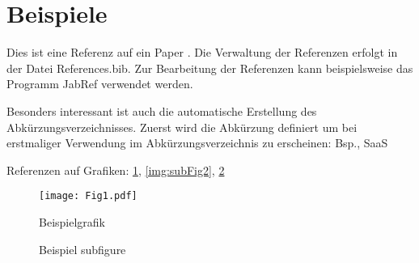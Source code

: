 \section{Beispiele}
Dies  ist eine Referenz auf ein Paper \cite{Kolter2009}. Die Verwaltung der Referenzen erfolgt in der Datei References.bib. Zur Bearbeitung der Referenzen kann beispielsweise das Programm JabRef verwendet werden.

Besonders interessant ist auch die automatische Erstellung des Abkürzungsverzeichnisses. Zuerst wird die Abkürzung definiert um bei erstmaliger Verwendung im Abkürzungsverzeichnis zu erscheinen: \ac{Bsp.}, \ac{SaaS}

Referenzen auf Grafiken: \ref{fig:Fig1}, \ref{img:subFig2}, \ref{img:subFigs}

\begin{figure}
  \centering
  \texttt{[image: Fig1.pdf]}
  \caption{Beispielgrafik}
  \label{fig:Fig1}
\end{figure}


\begin{figure}
  \centering
  \hfill
  \hfill
  \caption{Beispiel subfigure}
  \label{img:subFigs}
\end{figure}



\lstset{language=JAVA, breaklines=true, tabsize=2}



